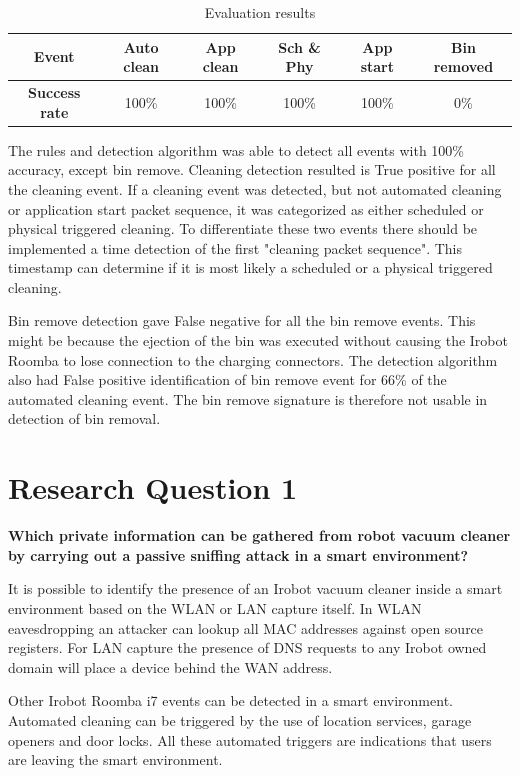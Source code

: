 \begin{table}[H]
\small
\centering
\caption{Evaluation results}
\label{tab:Evaluation results}
\begin{tabular}{|c|c|c|c|c|c|}
\hline
\textbf{Event}        & Auto clean & App clean & Sch \& Phy & App start & Bin removed \\ \hline
\textbf{Success rate} & 100\%           & 100\%             & 100\% & 100\%             & 0\%         \\ \hline
\end{tabular}
\end{table}

The rules and detection algorithm was able to detect all events with 100\% accuracy, except bin remove. Cleaning detection resulted is True positive for all the cleaning event. If a cleaning event was detected, but not automated cleaning or application start packet sequence, it was categorized as either scheduled or physical triggered cleaning. To differentiate these two events there should be implemented a time detection of the first "cleaning packet sequence". This timestamp can determine if it is most likely a scheduled or a physical triggered cleaning. 

Bin remove detection gave False negative for all the bin remove events. This might be because the ejection of the bin was executed without causing the Irobot Roomba to lose connection to the charging connectors. The detection algorithm also had False positive identification of bin remove event for 66\% of the automated cleaning event. The bin remove signature is therefore not usable in detection of bin removal. 


\section{Research Question 1}
\textbf{Which private information can be gathered from robot vacuum cleaner by carrying out a passive sniffing attack in a smart environment?}

It is possible to identify the presence of an Irobot vacuum cleaner inside a smart environment based on the WLAN or LAN capture itself. In WLAN eavesdropping an attacker can lookup all  MAC addresses against open source registers. For LAN capture the presence of DNS requests to any Irobot owned domain will place a device behind the WAN address.

Other Irobot Roomba i7 events can be detected in a smart environment. Automated cleaning can be triggered by the use of location services, garage openers and door locks. All these automated triggers are indications that users are leaving the smart environment. 

